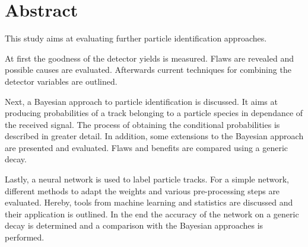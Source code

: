 \chapter*{Abstract}

This study aims at evaluating further particle identification approaches.

At first the goodness of the detector yields is measured. Flaws are revealed and possible causes are evaluated. Afterwards current techniques for combining the detector variables are outlined.

Next, a Bayesian approach to particle identification is discussed. It aims at producing probabilities of a track belonging to a particle species in dependance of the received signal. The process of obtaining the conditional probabilities is described in greater detail. In addition, some extensions to the Bayesian approach are presented and evaluated. Flaws and benefits are compared using a generic decay.

Lastly, a neural network is used to label particle tracks. For a simple network, different methods to adapt the weights and various pre-processing steps are evaluated. Hereby, tools from machine learning and statistics are discussed and their application is outlined. In the end the accuracy of the network on a generic decay is determined and a comparison with the Bayesian approaches is performed.
